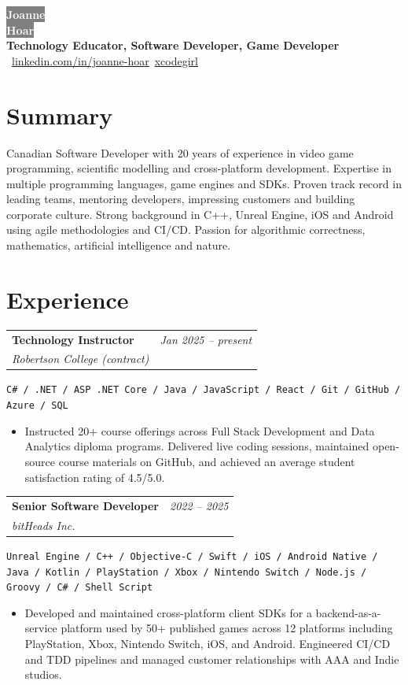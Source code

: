 \documentclass[10pt]{article}
\makeatletter
\newcommand{\tech}[1]{\textcolor{secondary}{\textbf{#1}}}
\newcommand{\experience}[4]{%
  \vspace{4pt}
  \begin{tabular*}{\textwidth}{@{}l@{\extracolsep{\fill}}r@{}}
    \textbf{#1} & \textit{#2} \\
    \textit{\small#3} & \textit{\small#4}
  \end{tabular*}
  \vspace{-4pt}
}
\makeatother
\begin{document}
\begin{center}
\colorbox{gray}{\HUGE\textcolor{white}{\textbf{Joanne}}} \\[2pt]
\colorbox{gray}{\HUGE\textcolor{white}{\textbf{Hoar}}} \\[6pt]
    {\Large \tech{Technology Educator, Software Developer, Game Developer}} \\[6pt]
    ~\href{https://linkedin.com/in/joanne-hoar/}{linkedin.com/in/joanne-hoar}\hfill {}~\href{https://github.com/xcodegirl}{xcodegirl}
\end{center}

\section*{Summary}

Canadian Software Developer with 20 years of experience in video game programming, scientific modelling and cross-platform development. Expertise in multiple programming languages, game engines and SDKs. Proven track record in leading teams, mentoring developers, impressing customers and building corporate culture. Strong background in C++, Unreal Engine, iOS and Android using agile methodologies and CI/CD. Passion for algorithmic correctness, mathematics, artificial intelligence and nature.

\section*{Experience}

\experience{Technology Instructor}{Jan 2025 -- present}{Robertson College (contract)}{}
\hspace{0.5cm}\texttt{C\# / .NET / ASP .NET Core / Java / JavaScript / React / Git / GitHub / Azure / SQL}
\begin{itemize}
    \item Instructed 20+ course offerings across Full Stack Development and Data Analytics diploma programs. Delivered live coding sessions, maintained open-source course materials on GitHub, and achieved an average student satisfaction rating of 4.5/5.0.
\end{itemize}

\experience{Senior Software Developer}{2022 -- 2025}{bitHeads Inc.}{}
\hspace{0.5cm}\texttt{Unreal Engine / C++ / Objective-C / Swift / iOS / Android Native / Java / Kotlin / PlayStation / Xbox / Nintendo Switch / Node.js / Groovy / C\# / Shell Script}
\begin{itemize}
    \item Developed and maintained cross-platform client SDKs for a backend-as-a-service platform used by 50+ published games across 12 platforms including PlayStation, Xbox, Nintendo Switch, iOS, and Android. Engineered CI/CD and TDD pipelines and managed customer relationships with AAA and Indie studios.
\end{itemize}
\end{document}
